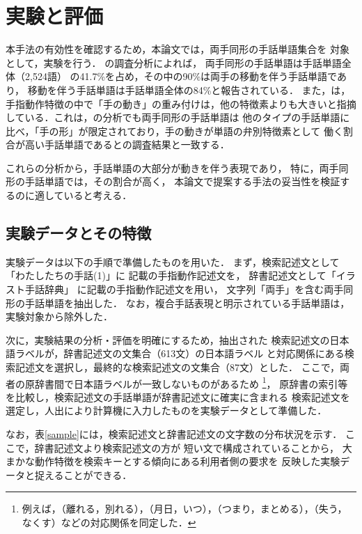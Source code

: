 \section {実験と評価}

本手法の有効性を確認するため，本論文では，両手同形の手話単語集合を
対象として，実験を行う．
\cite{Naitou1996}の調査分析によれば，
両手同形の手話単語は手話単語全体（2,524語）
の41.7\%を占め，その中の90\%は両手の移動を伴う手話単語であり，
移動を伴う手話単語は手話単語全体の84\%と報告されている．
また，\cite{Kamata1991}は，
手指動作特徴の中で「手の動き」の重み付けは，他の特徴素よりも大きいと指摘
している．これは，\cite{Naitou1996}の分析でも両手同形の手話単語は
他のタイプの手話単語に比べ，「手の形」が限定されており，手の動きが単語の弁別特徴素として
働く割合が高い手話単語であるとの調査結果と一致する．

これらの分析から，手話単語の大部分が動きを伴う表現であり，
特に，両手同形の手話単語では，その割合が高く，
本論文で提案する手法の妥当性を検証するのに適していると考える．

\subsection {実験データとその特徴}

実験データは以下の手順で準備したものを用いた．
まず，検索記述文として「わたしたちの手話(1)」\cite{Watashi1986}に
記載の手指動作記述文を，
辞書記述文として「イラスト手話辞典」\cite{MaruyamaKoji1984}
に記載の手指動作記述文を用い，
文字列「両手」を含む両手同形の手話単語を抽出した．
なお，複合手話表現と明示されている手話単語は，実験対象から除外した．

次に，実験結果の分析・評価を明確にするため，抽出された
検索記述文の日本語ラベルが，辞書記述文の文集合（613文）の日本語ラベル
と対応関係にある検索記述文を選択し，最終的な検索記述文の文集合（87文）とした．
ここで，両者の原辞書間で日本語ラベルが一致しないものがあるため
\footnote{例えば，（離れる，別れる），（月日，いつ），（つまり，まとめる），（失う，なくす）などの対応関係を同定した．}，
原辞書の索引等を比較し，検索記述文の手話単語が辞書記述文に確実に含まれる
検索記述文を選定し，人出により計算機に入力したものを実験データとして準備した．

なお，表\ref{sample}には，検索記述文と辞書記述文の文字数の分布状況を示す．
ここで，辞書記述文より検索記述文の方が
短い文で構成されていることから，
大まかな動作特徴を検索キーとする傾向にある利用者側の要求を
反映した実験データと捉えることができる．

